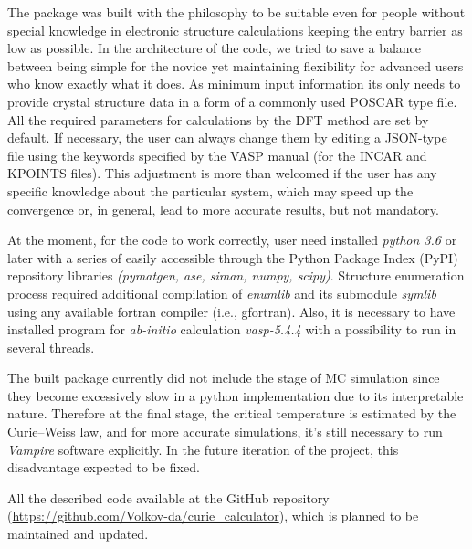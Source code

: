 The package was built with the philosophy to be suitable even for people without special knowledge in electronic structure calculations keeping the entry barrier as low as possible.
In the architecture of the code, we tried to save a balance between being simple for the novice yet maintaining flexibility for advanced users who know exactly what it does. 
As minimum input information its only needs to provide crystal structure data in a form of a commonly used POSCAR type file. All the required parameters for calculations by the DFT method are set by default.  If necessary, the user can always change them by editing a JSON-type file using the keywords specified by the VASP manual (for the INCAR and KPOINTS files). This adjustment is more than welcomed if the user has any specific knowledge about the particular system, which may speed up the convergence or, in general, lead to more accurate results, but not mandatory.

At the moment, for the code to work correctly, user need installed \textit{python 3.6} or later with a series of easily accessible through the Python Package Index (PyPI) repository libraries \textit{(pymatgen,  ase,  siman,  numpy, scipy)}. Structure enumeration process required additional compilation of \textit{enumlib} and its submodule \textit{symlib} using any available fortran compiler (i.e., gfortran). 
Also, it is necessary to have installed program for \textit{ab-initio} calculation \textit{vasp-5.4.4} with a possibility to run in several threads.

The built package currently did not include the stage of MC simulation since they become excessively slow in a python implementation due to its interpretable nature. Therefore at the final stage, the critical temperature is estimated by the Curie–Weiss law, and for more accurate simulations, it's still necessary to run \textit{Vampire} software explicitly.  In the future iteration of the project, this disadvantage expected to be fixed.

All the described code available at the GitHub repository (\url{https://github.com/Volkov-da/curie_calculator}), which is planned to be maintained and updated.